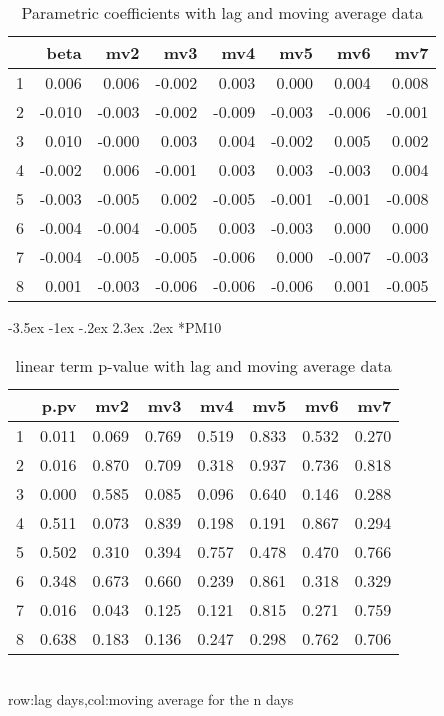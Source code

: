 \documentclass[a4paper, 12pt]{article}
\makeatletter
\def\large{\fontsize{14}{20}\selectfont}
\renewcommand\subsection{\@startsection {subsection}{1}{\z@}%
                                   {-3.5ex \@plus -1ex \@minus -.2ex}%
                                   {2.3ex \@plus.2ex}%
                                   {\centering\normalfont\large\bfseries}}
\makeatother
\begin{document}
\begin{table}[h]
\centering
\caption{Parametric coefficients with lag and moving average data}
\begin{tabular}{rrrrrrrr}
  \hline
 & beta & mv2 & mv3 & mv4 & mv5 & mv6 & mv7 \\
  \hline
1 & 0.006 & 0.006 & -0.002 & 0.003 & 0.000 & 0.004 & 0.008 \\
  2 & -0.010 & -0.003 & -0.002 & -0.009 & -0.003 & -0.006 & -0.001 \\
  3 & 0.010 & -0.000 & 0.003 & 0.004 & -0.002 & 0.005 & 0.002 \\
  4 & -0.002 & 0.006 & -0.001 & 0.003 & 0.003 & -0.003 & 0.004 \\
  5 & -0.003 & -0.005 & 0.002 & -0.005 & -0.001 & -0.001 & -0.008 \\
  6 & -0.004 & -0.004 & -0.005 & 0.003 & -0.003 & 0.000 & 0.000 \\
  7 & -0.004 & -0.005 & -0.005 & -0.006 & 0.000 & -0.007 & -0.003 \\
  8 & 0.001 & -0.003 & -0.006 & -0.006 & -0.006 & 0.001 & -0.005 \\
   \hline
\end{tabular}
\end{table}
\clearpage
\subsection*{PM10}
\begin{table}[h]
\centering
\caption{linear term p-value with lag and moving average data}
\begin{tabular}{rrrrrrrr}
  \hline
 & p.pv & mv2 & mv3 & mv4 & mv5 & mv6 & mv7 \\
  \hline
1 & 0.011 & 0.069 & 0.769 & 0.519 & 0.833 & 0.532 & 0.270 \\
  2 & 0.016 & 0.870 & 0.709 & 0.318 & 0.937 & 0.736 & 0.818 \\
  3 & 0.000 & 0.585 & 0.085 & 0.096 & 0.640 & 0.146 & 0.288 \\
  4 & 0.511 & 0.073 & 0.839 & 0.198 & 0.191 & 0.867 & 0.294 \\
  5 & 0.502 & 0.310 & 0.394 & 0.757 & 0.478 & 0.470 & 0.766 \\
  6 & 0.348 & 0.673 & 0.660 & 0.239 & 0.861 & 0.318 & 0.329 \\
  7 & 0.016 & 0.043 & 0.125 & 0.121 & 0.815 & 0.271 & 0.759 \\
  8 & 0.638 & 0.183 & 0.136 & 0.247 & 0.298 & 0.762 & 0.706 \\
   \hline
\end{tabular}
\\row:lag days,col:moving average for the n days
\end{table}
\end{document}
